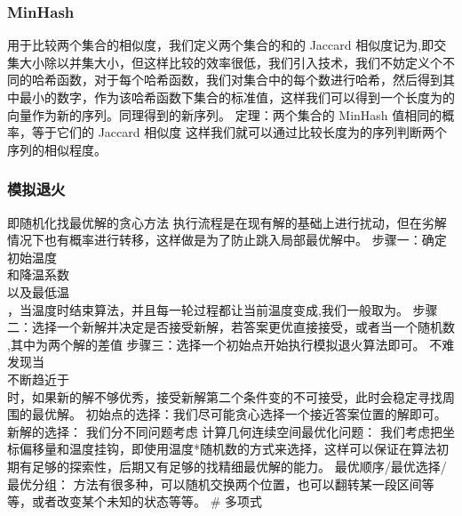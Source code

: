 \documentclass[8pt,a4paper]{article}
\newcommand{\txt}[1]{\par\noindent\footnotesize #1}
\newcommand{\inlineformula}[1]{\ensuremath{}}
\newcommand{\displayformula}[1]{%
    \vspace{0.2em}
    \[
        
    \]
}
\begin{document}
\begin{multicols}{2}
        \subsubsection{MinHash}
            \txt{用于比较两个集合的相似度，我们定义两个集合的\inlineformula{./assets/formulas_tex/formula_389.tex}和\inlineformula{./assets/formulas_tex/formula_390.tex}的 Jaccard 相似度记为\inlineformula{./assets/formulas_tex/formula_391.tex},即交集大小除以并集大小，但这样比较的效率很低，我们引入\inlineformula{./assets/formulas_tex/formula_392.tex}技术，我们不妨定义\inlineformula{./assets/formulas_tex/formula_393.tex}个不同的哈希函数，对于每个哈希函数，我们对集合\inlineformula{./assets/formulas_tex/formula_394.tex}中的每个数进行哈希，然后得到其中最小的数字，作为该哈希函数下\inlineformula{./assets/formulas_tex/formula_395.tex}集合的标准值，这样我们可以得到一个长度为\inlineformula{./assets/formulas_tex/formula_396.tex}的向量作为新的\inlineformula{./assets/formulas_tex/formula_397.tex}序列。同理得到\inlineformula{./assets/formulas_tex/formula_398.tex}的新序列。
定理：两个集合的 MinHash 值相同的概率，等于它们的 Jaccard 相似度
这样我们就可以通过比较长度为\inlineformula{./assets/formulas_tex/formula_399.tex}的序列判断两个序列的相似程度。}
        \subsubsection{模拟退火}
            \txt{即随机化找最优解的贪心方法
执行流程是在现有解的基础上进行扰动，但在劣解情况下也有概率进行转移，这样做是为了防止跳入局部最优解中。
步骤一：确定初始温度\displayformula{./assets/formulas_tex/formula_400.tex}和降温系数\displayformula{./assets/formulas_tex/formula_401.tex}以及最低温\displayformula{./assets/formulas_tex/formula_402.tex}，当温度\inlineformula{./assets/formulas_tex/formula_403.tex}时结束算法，并且每一轮过程都让当前温度\inlineformula{./assets/formulas_tex/formula_404.tex}变成\inlineformula{./assets/formulas_tex/formula_405.tex},我们一般取\inlineformula{./assets/formulas_tex/formula_406.tex}为\inlineformula{./assets/formulas_tex/formula_407.tex}。
步骤二：选择一个新解并决定是否接受新解，若答案更优直接接受，或者当一个随机数\inlineformula{./assets/formulas_tex/formula_408.tex},其中\inlineformula{./assets/formulas_tex/formula_409.tex}为两个解的差值
步骤三：选择一个初始点开始执行模拟退火算法即可。
不难发现当\displayformula{./assets/formulas_tex/formula_410.tex}不断趋近于\displayformula{./assets/formulas_tex/formula_411.tex}时，如果新的解不够优秀，接受新解第二个条件变的不可接受，此时会稳定寻找周围的最优解。
初始点的选择：我们尽可能贪心选择一个接近答案位置的解即可。
新解的选择：
我们分不同问题考虑
计算几何连续空间最优化问题：
我们考虑把坐标偏移量和温度挂钩，即使用温度*随机数的方式来选择，这样可以保证在算法初期有足够的探索性，后期又有足够的找精细最优解的能力。
最优顺序/最优选择/最优分组：
方法有很多种，可以随机交换两个位置，也可以翻转某一段区间等等，或者改变某个未知的状态等等。
\# 多项式}

\end{multicols}
\end{document}
